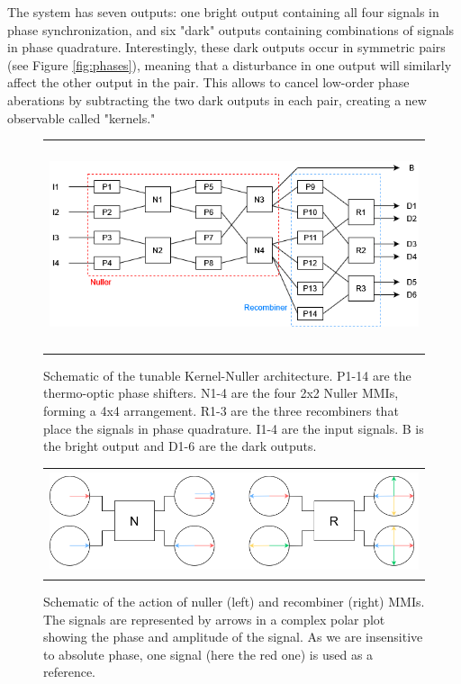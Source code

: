 \documentclass[]{spie}  %
\begin{document}
The system has seven outputs: one bright output containing all four signals in phase synchronization, and six "dark" outputs containing combinations of signals in phase quadrature. Interestingly, these dark outputs occur in symmetric pairs (see Figure \ref{fig:phases}), meaning that a disturbance in one output will similarly affect the other output in the pair. This allows to cancel low-order phase aberations by subtracting the two dark outputs in each pair, creating a new observable called "kernels."

\begin{figure} [ht]
    \begin{center}
    \begin{tabular}{c}
    \includegraphics[height=6cm]{img/kernel_nuller.png}
    \end{tabular}
    \end{center}
    \caption[kernel_nuller] 
    { \label{fig:kernel_nuller} 
    Schematic of the tunable Kernel-Nuller architecture. P1-14 are the thermo-optic phase shifters. N1-4 are the four 2x2 Nuller MMIs, forming a 4x4 arrangement. R1-3 are the three recombiners that place the signals in phase quadrature. I1-4 are the input signals. B is the bright output and D1-6 are the dark outputs.}
\end{figure} 

\begin{figure} [ht]
    \begin{center}
    \begin{tabular}{c}
    \includegraphics[height=3cm]{img/nuller_and_recombiner.png}
    \end{tabular}
    \end{center}
    \caption[nuller_and_recombiner] 
    { \label{fig:nuller_and_recombiner} 
    Schematic of the action of nuller (left) and recombiner (right) MMIs. The signals are represented by arrows in a complex polar plot showing the phase and amplitude of the signal. As we are insensitive to absolute phase, one signal (here the red one) is used as a reference.}
\end{figure}
\end{document}

